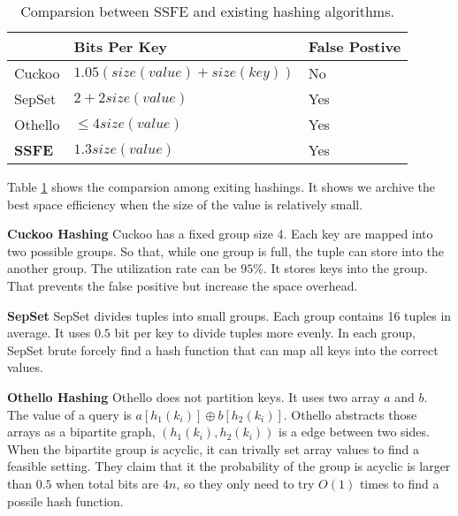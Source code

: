 \documentclass{article}
\begin{document}
\begin{table}[]
    \centering
    \begin{tabular}{lll}
        \hline
                  & Bits Per Key                     & False Postive \\ \hline\hline
    Cuckoo        & $1.05 (size(value) + size(key))$ & No            \\ \hline
    SepSet        & $2 + 2 size(value)$              & Yes           \\ \hline
    Othello       & $\le 4 size(value)$              & Yes           \\ \hline
    \textbf{SSFE} & $1.3 size(value)$                & Yes          
    \\ \hline
    \end{tabular}
    \caption{Comparsion between SSFE and existing hashing algorithms.}
    \label{tab:comparsion}
\end{table}

Table \ref{tab:comparsion} shows the comparsion among exiting hashings. It shows we archive the best space efficiency when the size of the value is relatively small.

\textbf{Cuckoo Hashing} Cuckoo has a fixed group size 4. Each key are mapped into two possible groups. So that, while one group is full, the tuple can store into the another group. The utilization rate can be $95\%$. It stores keys into the group. That prevents the false positive but increase the space overhead.

\textbf{SepSet} SepSet divides tuples into small groups. Each group contains 16 tuples in average. It uses $0.5$ bit per key to divide tuples more evenly. In each group, SepSet brute forcely find a hash function that can map all keys into the correct values. 

\textbf{Othello Hashing} Othello does not partition keys. It uses two array $a$ and $b$. The value of a query is $a[h_1(k_i)] \oplus b[h_2(k_i)]$. Othello abstracts those arrays as a bipartite graph, $(h_1(k_i), h_2(k_i))$ is a edge between two sides. When the bipartite group is acyclic, it can trivally set array values to find a feasible setting. They claim that it the probability of the group is acyclic is larger than $0.5$ when total bits are $4n$, so they only need to try $O(1)$ times to find a possile hash function. 



\end{document}
